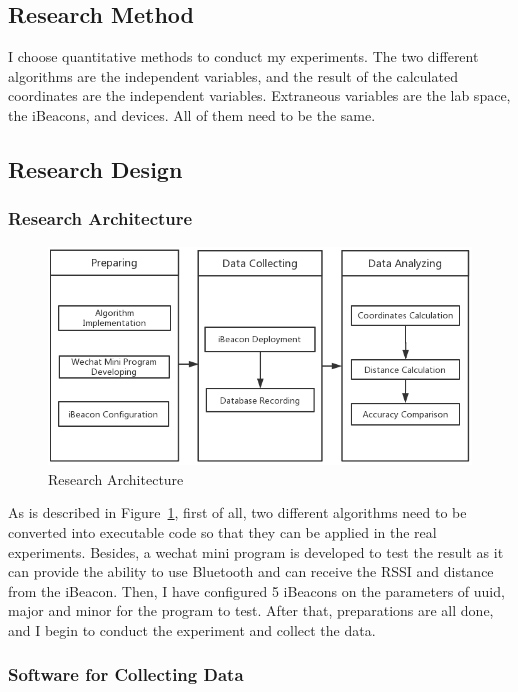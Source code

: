 \documentclass{sigchi}
\begin{document}
\subsection{Research Method}

I choose quantitative methods to conduct my experiments. The two different algorithms are the independent variables, and the result of the calculated coordinates are the independent variables. Extraneous variables are the lab space, the iBeacons, and devices. All of them need to be the same.

\subsection{Research Design}

\subsubsection{Research Architecture}

\begin{figure}[!h]
\centering
\includegraphics[width=1\columnwidth]{9.png}
\caption{Research Architecture}
\label{fig:9}
\end{figure}

As is described in Figure~\ref{fig:9}, first of all, two different algorithms need to be converted into executable code so that they can be applied in the real experiments. Besides, a wechat mini program is developed to test the result as it can provide the ability to use Bluetooth and can receive the RSSI and distance from the iBeacon. Then, I have configured 5 iBeacons on the parameters of uuid, major and minor for the program to test. After that, preparations are all done, and I begin to conduct the experiment and collect the data.

\subsubsection{Software for Collecting Data}
\end{document}
